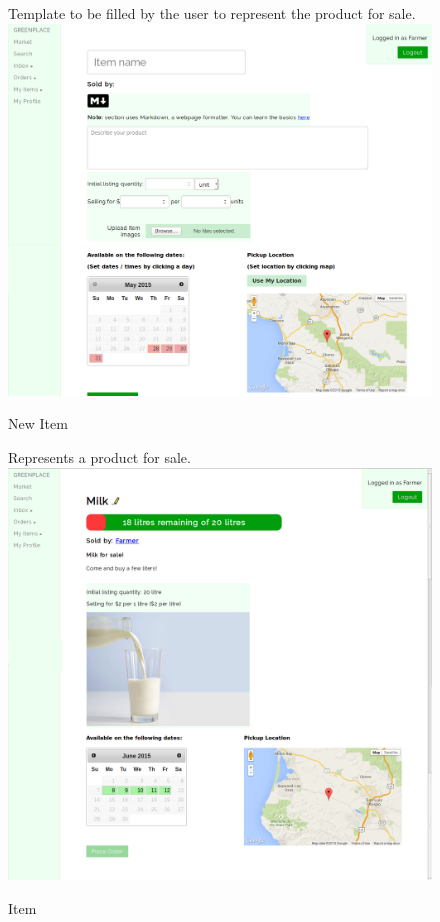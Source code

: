 \documentclass[letterpaper, 10 pt, conference]{ieeeconf}  %
\begin{document}
\begin{figure}[H]
  \caption{New Item}
  Template to be filled by the user to represent the product for sale.\\
  \label{fig:itemnew}
  \centering
    \includegraphics[width=\textwidth]{images/itemnew.png}
\end{figure}

\begin{figure}[H]
  \caption{Item}
  Represents a product for sale.\\
  \label{fig:item}
  \centering
    \includegraphics[width=\textwidth]{images/item.png}
\end{figure}
\end{document}
